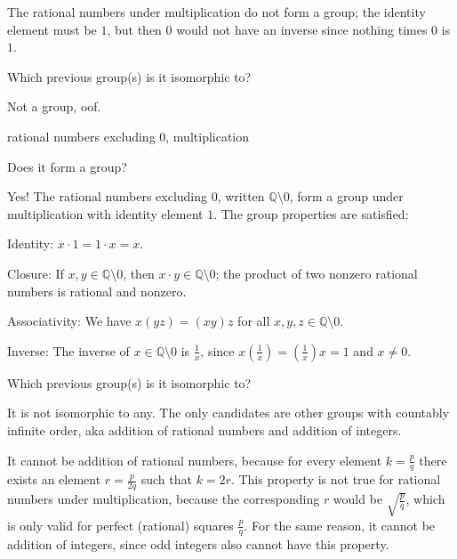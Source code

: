 \documentclass[../key.tex]{subfiles}
\begin{document}
\noindent The rational numbers under multiplication do not form a group; the identity element must be $1$, but then $0$ would not have an inverse since nothing times $0$ is $1$.

\begin{iinner_problem}
\item Which previous group(s) is it isomorphic to?
\end{iinner_problem}

\noindent Not a group, oof.

\begin{inner_problem}
\item rational numbers excluding $0$, multiplication
\end{inner_problem}

\begin{iinner_problem}[start=1]
\item Does it form a group?
\end{iinner_problem}

\noindent Yes! The rational numbers excluding $0$, written $\mathbb{Q} \setminus {0}$, form a group under multiplication with identity element $1$. The group properties are satisfied:

Identity: $x\cdot 1=1\cdot x=x$.

Closure: If $x,y\in \mathbb{Q} \setminus {0}$, then $x\cdot y\in \mathbb{Q} \setminus {0}$; the product of two nonzero rational numbers is rational and nonzero.

Associativity: We have $x(yz)=(xy)z$ for all $x,y,z \in \mathbb{Q} \setminus {0}$.

Inverse: The inverse of $x\in \mathbb{Q} \setminus {0}$ is $\frac{1}{x}$, since $x\left(\frac{1}{x}\right)=\left(\frac{1}{x}\right)x=1$ and $x\neq 0$.

\begin{iinner_problem}
\item Which previous group(s) is it isomorphic to?
\end{iinner_problem}

\noindent It is not isomorphic to any. The only candidates are other groups with countably infinite order, aka addition of rational numbers and addition of integers.

It cannot be addition of rational numbers, because for every element $k=\frac{p}{q}$ there exists an element $r=\frac{p}{2q}$ such that $k=2r$. This property is not true for rational numbers under multiplication, because the corresponding $r$ would be $\sqrt{\frac{p}{q}}$, which is only valid for perfect (rational) squares $\frac{p}{q}$. For the same reason, it cannot be addition of integers, since odd integers also cannot have this property.
\end{document}

